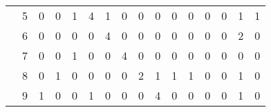 \documentclass[12pt]{article}
\begin{document}
\begin{enumerate}
\begin{table}[H]
\begin{tabular}{@{}llclllllllllllll@{}}
\cellcolor[HTML]{34FF34}                                   & \cellcolor[HTML]{34FF34}5  & 0                         & 0                         & 1                         & 4                         & 1                         & 0                         & 0                         & 0                         & 0                          & 0                          & 0                          & 0                          & 1                          & 1                          \\
\cellcolor[HTML]{34FF34}                                   & \cellcolor[HTML]{34FF34}6  & 0                         & 0                         & 0                         & 0                         & 4                         & 0                         & 0                         & 0                         & 0                          & 0                          & 0                          & 0                          & 2                          & 0                          \\
\cellcolor[HTML]{34FF34}                                   & \cellcolor[HTML]{34FF34}7  & 0                         & 0                         & 1                         & 0                         & 0                         & 4                         & 0                         & 0                         & 0                          & 0                          & 0                          & 0                          & 0                          & 0                          \\
\cellcolor[HTML]{34FF34}                                   & \cellcolor[HTML]{34FF34}8  & 0                         & 1                         & 0                         & 0                         & 0                         & 0                         & 2                         & 1                         & 1                          & 1                          & 0                          & 0                          & 1                          & 0                          \\
\cellcolor[HTML]{34FF34}                                   & \cellcolor[HTML]{34FF34}9  & 1                         & 0                         & 0                         & 1                         & 0                         & 0                         & 0                         & 4                         & 0                          & 0                          & 0                          & 0                          & 1                          & 0                          \\

\end{tabular}
\end{table}
\end{enumerate}
\end{document}
